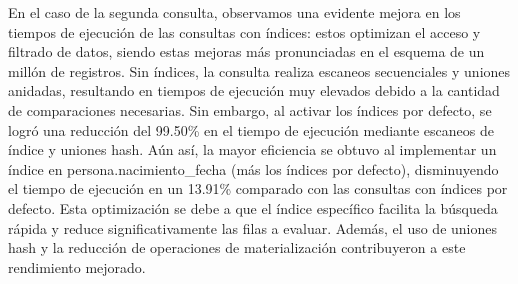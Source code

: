 En el caso de la segunda consulta, observamos una evidente mejora en los tiempos de ejecución de las consultas con índices: estos optimizan el acceso y filtrado de datos, siendo estas mejoras más pronunciadas en el esquema de un millón de registros. Sin índices, la consulta realiza escaneos secuenciales y uniones anidadas, resultando en tiempos de ejecución muy elevados debido a la cantidad de comparaciones necesarias. Sin embargo, al activar los índices por defecto, se logró una reducción del 99.50\% en el tiempo de ejecución mediante escaneos de índice y uniones hash. Aún así, la mayor eficiencia se obtuvo al implementar un índice en persona.nacimiento\_fecha (más los índices por defecto), disminuyendo el tiempo de ejecución en un 13.91\% comparado con las consultas con índices por defecto. Esta optimización se debe a que el índice específico facilita la búsqueda rápida y reduce significativamente las filas a evaluar. Además, el uso de uniones hash y la reducción de operaciones de materialización contribuyeron a este rendimiento mejorado.
